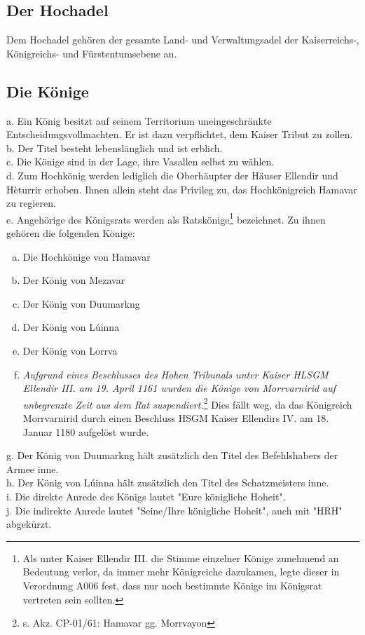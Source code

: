 \documentclass{article}
\begin{document}
\subsection{Der Hochadel}
Dem Hochadel gehören der gesamte Land- und Verwaltungsadel der Kaiserreichs-, Königreichs- und Fürstentumsebene an.

\subsection{Die Könige}\label{koenige} 
a. Ein König besitzt auf seinem Territorium uneingeschränkte Entscheidungsvollmachten. Er ist dazu verpflichtet, dem Kaiser Tribut zu zollen.  \\
b. Der Titel besteht lebenslänglich und ist erblich.  \\
c. Die Könige sind in der Lage, ihre Vasallen selbst zu wählen.  \\
d. Zum Hochkönig werden lediglich die Oberhäupter der Häuser Ellendir und Hèturrir erhoben. Ihnen allein steht das Privileg zu, das Hochkönigreich Hamavar zu regieren.\\
e. Angehörige des Königsrats werden als Ratskönige\footnote{Als unter Kaiser Ellendir III. die Stimme einzelner Könige zunehmend an Bedeutung verlor, da immer mehr Königreiche dazukamen, legte dieser in Verordnung A006 fest, dass nur noch bestimmte Könige im Königsrat vertreten sein sollten.} bezeichnet. Zu ihnen gehören die folgenden Könige:  \\
\begin{enumerate}[a)]
\item Die Hochkönige von Hamavar  
\item Der König von Mezavar  
\item Der König von Duumarkng  
\item Der König von Lúinna  
\item Der König von Lorrva  
\item \textit{Aufgrund eines Beschlusses des Hohen Tribunals unter Kaiser HLSGM Ellendir III. am 19. April 1161 wurden die Könige von Morrvarnirid auf unbegrenzte Zeit aus dem Rat suspendiert.}\footnote{s. Akz. CP-01/61: Hamavar gg. Morrvayon}  Dies fällt weg, da das Königreich Morrvarnirid durch einen Beschluss HSGM Kaiser Ellendirs IV. am 18. Januar 1180 aufgelöst wurde.
\end{enumerate}
g. Der König von Duumarkng hält zusätzlich den Titel des Befehlshabers der Armee inne.  \\
h. Der König von Lúinna hält zusätzlich den Titel des Schatzmeisters inne.  \\
i. Die direkte Anrede des Königs lautet "Eure königliche Hoheit".  \\
j. Die indirekte Anrede lautet "Seine/Ihre königliche Hoheit", auch mit "HRH" abgekürzt.
\end{document}
